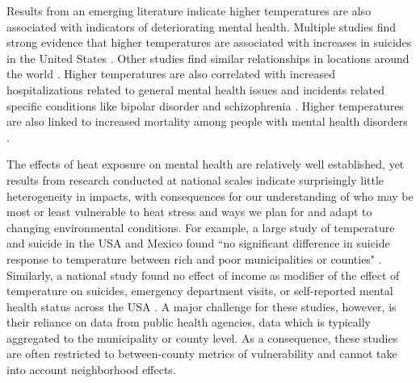 \documentclass[fleqn,10pt]{wlscirep}
\begin{document}
Results from an emerging literature indicate higher temperatures are also associated with indicators of deteriorating mental health.  Multiple studies find strong evidence that higher temperatures are associated with increases in suicides in the United States \cite{Burke2018Aug, Mullins2019Dec, Dixon2007May}. Other studies find similar relationships in locations around the world \cite{Qi2014Dec, Page2007Aug, Likhvar2011Jan}. Higher temperatures are also correlated with increased hospitalizations related to general mental health issues \cite{Obradovich2018Oct, Mullins2019Dec} and incidents related specific conditions like bipolar disorder and schizophrenia \cite{Lee2007Jan, Sung2013Feb}. Higher temperatures are also linked to increased mortality among people with mental health disorders \cite{Hansen2008Oct}.

The effects of heat exposure on mental health are relatively well established, yet results from research conducted at national scales indicate surprisingly little heterogeneity in impacts, with consequences for our understanding of who may be most or least vulnerable to heat stress and ways we plan for and adapt to changing environmental conditions. For example, a large study of temperature and suicide in the USA and Mexico found ``no significant difference in suicide response to temperature between rich and poor municipalities or counties" \cite{Burke2018Aug}. Similarly, a national study found no effect of income as modifier of the effect of temperature on suicides, emergency department visits, or self-reported mental health status across the USA \cite{Mullins2019Dec}. A major challenge for these studies, however, is their reliance on data from public health agencies, data which is typically aggregated to the municipality or county level.  As a consequence, these studies are often restricted to between-county metrics of vulnerability and cannot take into account neighborhood effects.
\end{document}
